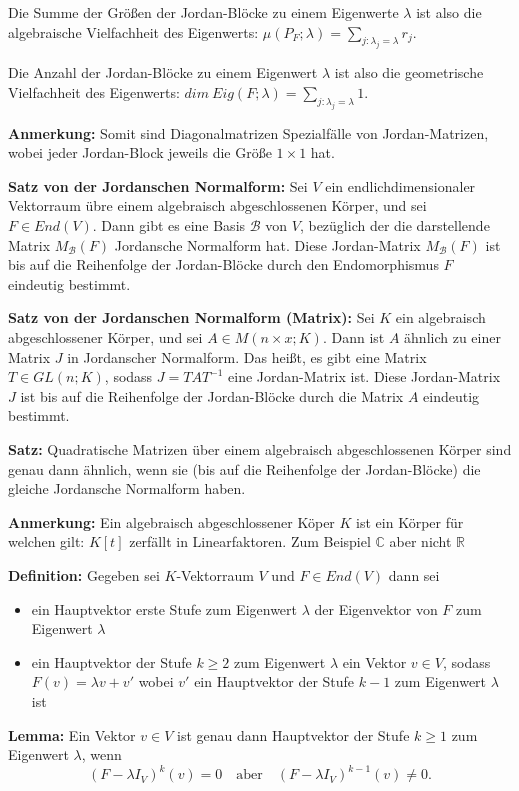 \documentclass{article}
\begin{document}
Die Summe der Größen der Jordan-Blöcke zu einem Eigenwerte $\lambda$ ist also
die algebraische Vielfachheit des Eigenwerts:
$\mu(P_F;\lambda)=\sum_{j:\lambda_j=\lambda}r_j.$

Die Anzahl der Jordan-Blöcke zu einem Eigenwert $\lambda$ ist also die
geometrische Vielfachheit des Eigenwerts: $dim\
Eig(F;\lambda)=\sum_{j:\lambda_j=\lambda}1$.

\textbf{Anmerkung:} Somit sind Diagonalmatrizen Spezialfälle von
Jordan-Matrizen, wobei jeder Jordan-Block jeweils die Größe $1\times1$ hat.

\textbf{Satz von der Jordanschen Normalform:} Sei $V$ ein endlichdimensionaler
Vektorraum übre einem algebraisch abgeschlossenen Körper, und sei $F\in
End(V)$. Dann gibt es eine Basis $\mathcal{B}$ von $V$, bezüglich der die
darstellende Matrix $M_\mathcal{B}(F)$ Jordansche Normalform hat. Diese
Jordan-Matrix $M_\mathcal{B}(F)$ ist bis auf die Reihenfolge der Jordan-Blöcke
durch den Endomorphismus $F$ eindeutig bestimmt.

\textbf{Satz von der Jordanschen Normalform (Matrix):} Sei $K$ ein algebraisch
abgeschlossener Körper, und sei $A\in M(n\times x;K)$. Dann ist $A$ ähnlich zu
einer Matrix $J$ in Jordanscher Normalform. Das heißt, es gibt eine Matrix
$T\in GL(n;K)$, sodass $J=TAT^{-1}$ eine Jordan-Matrix ist. Diese Jordan-Matrix
$J$ ist bis auf die Reihenfolge der Jordan-Blöcke durch die Matrix $A$
eindeutig bestimmt.

\textbf{Satz:} Quadratische Matrizen über einem algebraisch abgeschlossenen
Körper sind genau dann ähnlich, wenn sie (bis auf die Reihenfolge der
Jordan-Blöcke) die gleiche Jordansche Normalform haben.

\textbf{Anmerkung:} Ein algebraisch abgeschlossener Köper $K$ ist ein Körper
für welchen gilt: $K[t]$ zerfällt in Linearfaktoren. Zum Beispiel $\mathbb{C}$
aber nicht $\mathbb{R}$

\textbf{Definition:} Gegeben sei $K$-Vektorraum $V$ und $F\in End(V)$ dann sei
\begin{itemize}
\item[i)] ein Hauptvektor erste Stufe zum Eigenwert $\lambda$ der Eigenvektor
	von $F$ zum Eigenwert $\lambda$
\item[ii)] ein Hauptvektor der Stufe $k\geq2$ zum Eigenwert $\lambda$ ein
	Vektor $v\in V$, sodass $F(v)=\lambda v+ v'$ wobei $v'$ ein Hauptvektor
	der Stufe $k-1$ zum Eigenwert $\lambda$ ist
\end{itemize}

\textbf{Lemma:} Ein Vektor $v\in V$ ist genau dann Hauptvektor der Stufe
$k\geq1$ zum Eigenwert $\lambda$, wenn 
\begin{equation*}
(F-\lambda I_V)^k(v)=0\quad\text{aber}\quad(F-\lambda I_V)^{k-1}(v)\neq0.
\end{equation*}
\end{document}
